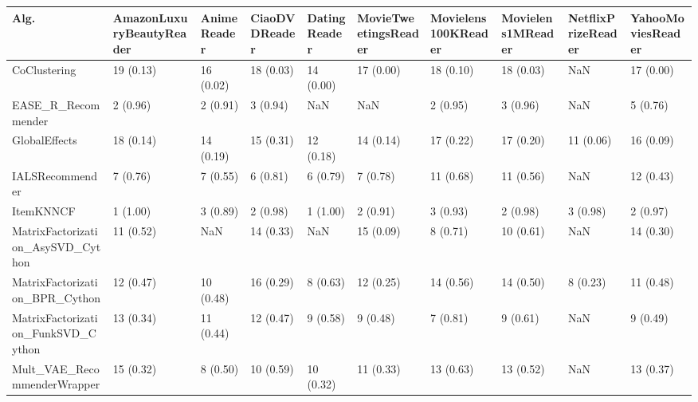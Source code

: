 \begin{tabular}{llllllllll}
\toprule
                               Alg. & AmazonLuxuryBeautyReader & AnimeReader & CiaoDVDReader & DatingReader & MovieTweetingsReader & Movielens100KReader & Movielens1MReader & NetflixPrizeReader & YahooMoviesReader \\
\midrule
                       CoClustering &                19 (0.13) &   16 (0.02) &     18 (0.03) &    14 (0.00) &            17 (0.00) &           18 (0.10) &         18 (0.03) &                NaN &         17 (0.00) \\
                 EASE\_R\_Recommender &                 2 (0.96) &    2 (0.91) &      3 (0.94) &          NaN &                  NaN &            2 (0.95) &          3 (0.96) &                NaN &          5 (0.76) \\
                      GlobalEffects &                18 (0.14) &   14 (0.19) &     15 (0.31) &    12 (0.18) &            14 (0.14) &           17 (0.22) &         17 (0.20) &          11 (0.06) &         16 (0.09) \\
                    IALSRecommender &                 7 (0.76) &    7 (0.55) &      6 (0.81) &     6 (0.79) &             7 (0.78) &           11 (0.68) &         11 (0.56) &                NaN &         12 (0.43) \\
                          ItemKNNCF &                 1 (1.00) &    3 (0.89) &      2 (0.98) &     1 (1.00) &             2 (0.91) &            3 (0.93) &          2 (0.98) &           3 (0.98) &          2 (0.97) \\
  MatrixFactorization\_AsySVD\_Cython &                11 (0.52) &         NaN &     14 (0.33) &          NaN &            15 (0.09) &            8 (0.71) &         10 (0.61) &                NaN &         14 (0.30) \\
     MatrixFactorization\_BPR\_Cython &                12 (0.47) &   10 (0.48) &     16 (0.29) &     8 (0.63) &            12 (0.25) &           14 (0.56) &         14 (0.50) &           8 (0.23) &         11 (0.48) \\
 MatrixFactorization\_FunkSVD\_Cython &                13 (0.34) &   11 (0.44) &     12 (0.47) &     9 (0.58) &             9 (0.48) &            7 (0.81) &          9 (0.61) &                NaN &          9 (0.49) \\
        Mult\_VAE\_RecommenderWrapper &                15 (0.32) &    8 (0.50) &     10 (0.59) &    10 (0.32) &            11 (0.33) &           13 (0.63) &         13 (0.52) &                NaN &         13 (0.37) \\

\end{tabular}
